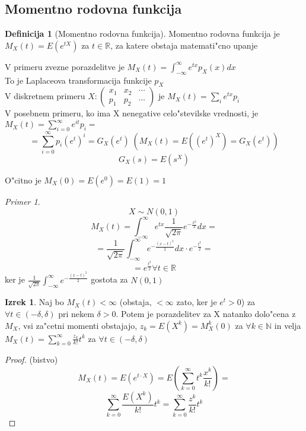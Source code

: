 \documentclass[a4paper,12pt]{article}
\theoremstyle{definition}
\newtheorem{defn}[counter]{Definicija}
\newtheorem{theorem}[counter]{Izrek}
\theoremstyle{remark}
\newtheorem*{ex}{Primer}
\newcommand{\N}{\mathbb{N}}
\newcommand{\R}{\mathbb{R}}
\begin{document}
\subsection{Momentno rodovna funkcija}

\begin{defn}[Momentno rodovna funkcija]
    Momentno rodovna funkcija je $M_X(t) = E(e^{tX})$ za $t \in \R$, za katere obstaja matemati"cno upanje
\end{defn}

V primeru zvezne porazdelitve je $M_X(t) = \int_{-\infty}^{\infty} e^{tx} p_X(x) dx$ \\
To je Laplaceova transformacija funkcije $p_X$ \\
V diskretnem primeru $X: \begin{pmatrix}x_1 & x_2 & \cdots \\ p_1 & p_2 & \cdots \end{pmatrix}$ je
$M_X(t) = \sum_i e^{tx} p_i$ \\

V posebnem primeru, ko ima X nenegative celo"stevilske vrednosti, je $M_X(t) = \sum_{i=0}^{\infty} e^{it} p_i =$
\[= \sum_{i=0}^{\infty} p_i (e^{t})^{i} = G_X(e^t) \; (M_X(t) = E((e^t)^X) = G_X(e^t))\]
\[G_X(s) = E(s^X)\]

O"citno je $M_X(0) = E(e^0) = E(1) = 1$

\begin{ex}
    \[X \sim N(0,1)\]
    \[M_X(t) = \int_{-\infty}^{\infty} e^{tx} \frac{1}{\sqrt{2\pi}} e^{-\frac{x^2}{2}} dx =\]
    \[= \frac{1}{\sqrt{2\pi}} \int_{-\infty}^{\infty} e^{-\frac{(x-t)^2}{2}} dx \cdot e^{-\frac{t^2}{2}} =\]
    \[= e^{\frac{t^2}{2}} \forall t \in \R\]
    ker je $\frac{1}{\sqrt{2\pi}} \int_{-\infty}^{\infty} e^{-\frac{(x-t)^2}{2}}$ gostota za $N(0,1)$
\end{ex}

\begin{theorem}
    Naj bo $M_X(t) < \infty$ (obstaja, $< \infty$ zato, ker je $e^t > 0$) za $\forall t \in (-\delta, \delta)$ pri
    nekem $\delta > 0$. Potem je porazdelitev za X natanko dolo"cena z $M_X$, vsi za"cetni momenti obstajajo,
    $z_k = E(X^k) = M_X^{k}(0)$ za $\forall k \in \N$ in velja $M_X(t) = \sum_{k=0}^{\infty} \frac{z_k}{k!} t^k$ %
    za $\forall t \in (-\delta, \delta)$
\end{theorem}

\begin{proof} (bistvo)
    \[M_X(t) = E(e^{t \cdot X}) = E(\sum_{k=0}^{\infty} t^k \frac{x^k}{k!}) =\]
    \[\sum_{k=0}^{\infty} \frac{E(X^k)}{k!} t^k = \sum_{k=0}^{\infty} \frac{z^k}{k!} t^k\]
\end{proof}
\end{document}
